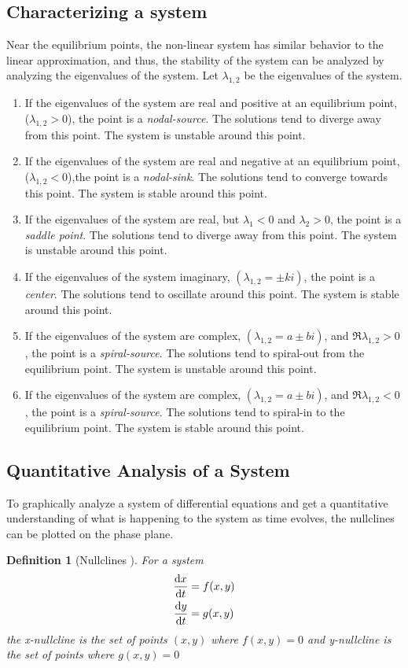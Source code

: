 \documentclass[11pt,1in]{article}
\newtheorem{definition}{Definition}
\begin{document}
\subsection{Characterizing a system}
Near the equilibrium points, the non-linear system has similar behavior to the linear approximation, and thus, the stability of the system can be analyzed by analyzing the eigenvalues of the system. Let $\lambda_{1,2}$ be the eigenvalues of the system.
\begin{enumerate}
	\item If the eigenvalues of the system are real and positive at an equilibrium point, ($\lambda_{1,2} > 0$), the point is a \emph{nodal-source}. The solutions tend to diverge away from this point. The system is unstable around this point. 
	\item If the eigenvalues of the system are real and negative at an equilibrium point, ($\lambda_{1,2} < 0$),the point is a \emph{nodal-sink}. The solutions tend to converge towards this point. The system is stable around this point. 
	\item If the eigenvalues of the system are real, but $\lambda_1 < 0$ and $\lambda_2 > 0$, the point is a \emph{saddle point}. The solutions tend to diverge away from this point. The system is unstable around this point.
	\item If the eigenvalues of the system imaginary, $(\lambda_{1,2} = \pm k i)$, the point is a \emph{center}.  The solutions tend to oscillate around this point. The system is stable around this point.
	\item If the eigenvalues of the system are complex, $(\lambda_{1,2} = a \pm b i)$, and $\Re{\lambda_{1,2}}> 0$, the point is a \emph{spiral-source}. The solutions tend to spiral-out from the equilibrium point. The system is unstable around this point.
	\item If the eigenvalues of the system are complex, $(\lambda_{1,2} = a \pm b i)$, and $\Re{\lambda_{1,2}}< 0$, the point is a \emph{spiral-source}. The solutions tend to spiral-in to the equilibrium point. The system is stable around this point.
\end{enumerate}

\subsection{Quantitative Analysis of a System}
To graphically analyze a system of differential equations and get a quantitative understanding of what is happening to the system as time evolves, the nullclines can be plotted on the phase plane. 
\begin{definition}[Nullclines \cite{diff_eq}]
	For a system 
	\begin{align*}
	\derivative{x}{t} &= f(x,y) \\
	\derivative{y}{t} &= g(x,y)
	\end{align*}
	the x-nullcline is the set of points $(x,y)$ where $f(x,y) = 0$ and y-nullcline is the set of points where $g(x,y) = 0$ 
\end{definition}
\end{document}

